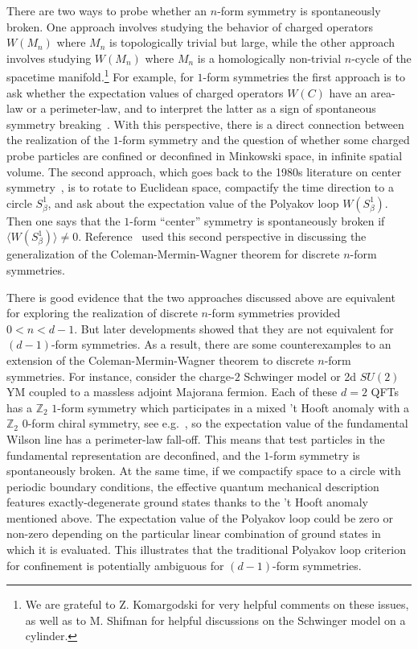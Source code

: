 \documentclass[11pt]{article}
\begin{document}
There are two ways to probe whether an $n$-form symmetry is spontaneously broken. One approach involves studying the behavior of charged operators $W(M_n)$ where $M_n$ is topologically trivial but large, while the other approach involves studying $W(M_n)$ where $M_n$ is a homologically non-trivial $n$-cycle of the spacetime manifold.\footnote{We are grateful to Z. Komargodski for very helpful comments on these issues, as well as to M. Shifman for helpful discussions on the Schwinger model on a cylinder.} For example, for $1$-form symmetries the first approach is to ask whether the expectation values of charged operators $W(C)$ have an area-law or a perimeter-law, and to interpret the latter as a sign of spontaneous symmetry breaking~\cite{Gaiotto:2014kfa}.   With this perspective, there is a direct connection between the realization of the $1$-form symmetry and the question of whether some charged probe particles are confined or deconfined in Minkowski space, in infinite spatial volume.  The second approach, which goes back to the 1980s literature on center symmetry~\cite{Gross:1980br,Weiss:1981ev}, is to rotate to Euclidean space, compactify the time direction to a circle $S^1_{\beta}$, and ask about the expectation value of the Polyakov loop $W(S^1_{\beta})$. Then one says that the $1$-form ``center'' symmetry is spontaneously broken if $\langle W(S^1_{\beta})\rangle \neq 0$. Reference~\cite{Gaiotto:2014kfa} used this second perspective in discussing the generalization of the Coleman-Mermin-Wagner theorem for discrete $n$-form symmetries.


There is good evidence that the two approaches discussed above are equivalent for exploring the realization of discrete $n$-form symmetries provided $0< n <d-1$.  But later developments showed that they are not equivalent for $(d-1)$-form symmetries.  As a result,  there are some counterexamples to an extension of the Coleman-Mermin-Wagner theorem to discrete $n$-form symmetries.  For instance, consider the charge-$2$ Schwinger model 
or 2d $SU(2)$ YM coupled to a massless adjoint Majorana fermion. Each of these $d=2$ 
QFTs has a $\mathbb{Z}_2$ $1$-form symmetry which participates in a mixed 't Hooft 
anomaly with a $\mathbb{Z}_2$ $0$-form chiral symmetry, see
e.g.~\cite{Gross:1995bp,Anber:2018jdf,Cherman:2019hbq}, so the expectation value of the 
fundamental Wilson line has a perimeter-law fall-off.  This means that test particles in the fundamental representation are deconfined, and the $1$-form symmetry is spontaneously broken.  At the same time, if we compactify space to a circle with periodic boundary conditions, the effective quantum mechanical description features exactly-degenerate ground states thanks to the 't Hooft anomaly mentioned above.  The expectation value of the Polyakov loop could be zero or non-zero depending on the particular linear combination of ground states in which it is evaluated.  This illustrates that the  traditional Polyakov loop criterion for confinement is potentially ambiguous for $(d-1)$-form symmetries.
\end{document}
